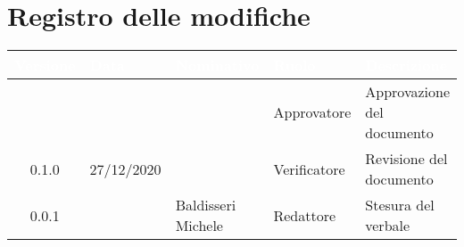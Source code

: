 \section*{Registro delle modifiche}
{
\renewcommand{\arraystretch}{1.5}
\centering
\begin{longtable}{c C{2.6cm}  C{2.6cm} C{2.6cm} C{3.5cm}}
\textcolor{white}{\textbf{Versione}}&
\textcolor{white}{\textbf{Data}}&
\textcolor{white}{\textbf{Nominativo}}&
\textcolor{white}{\textbf{Ruolo}}&
\textcolor{white}{\textbf{Descrizione}}\\	
\endhead
		
 &  &  & Approvatore & Approvazione del documento\\

0.1.0 & 27/12/2020 & \SP{} & Verificatore & Revisione del documento\\

0.0.1 & \Data{} & Baldisseri Michele & Redattore & Stesura del verbale\\
		
\end{longtable}
}
